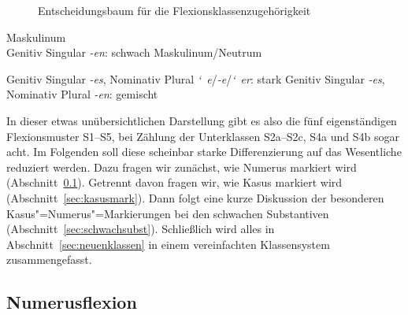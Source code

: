 \begin{figure}[!htbp]
  \centering
  \caption{Entscheidungsbaum für die Flexionsklassenzugehörigkeit}
  \label{fig:substklassentsch}
\end{figure}

\begin{exe}
  \ex\label{ex:wuppdich1} Maskulinum\\
    Genitiv Singular \textit{-en}: schwach
  \ex\label{ex:wuppdich2} Maskulinum\slash Neutrum
  \begin{xlist}
    \ex\label{ex:wuppdich2a} Genitiv Singular \textit{-es}, Nominativ Plural \textit{\char`~e}/\textit{-e}/\textit{\char`~er}: stark
    \ex\label{ex:wuppdich2b} Genitiv Singular \textit{-es}, Nominativ Plural \textit{-en}: gemischt
  \end{xlist}
\end{exe}

In dieser etwas unübersichtlichen Darstellung gibt es also die fünf eigenständigen Flexionsmuster S1--S5, bei Zählung der Unterklassen S2a--S2c, S4a und S4b sogar acht.
Im Folgenden soll diese scheinbar starke Differenzierung auf das Wesentliche reduziert werden.
Dazu fragen wir zunächst, wie Numerus markiert wird (Abschnitt~\ref{sec:pluralmark}).
Getrennt davon fragen wir, wie Kasus markiert wird (Abschnitt~\ref{sec:kasusmark}).
Dann folgt eine kurze Diskussion der besonderen Kasus"=Numerus"=Markierungen bei den schwachen Substantiven (Abschnitt~\ref{sec:schwachsubst}).
Schließlich wird alles in Abschnitt~\ref{sec:neuenklassen} in einem vereinfachten Klassensystem zusammengefasst.

\subsection{Numerusflexion}

\label{sec:pluralmark}

